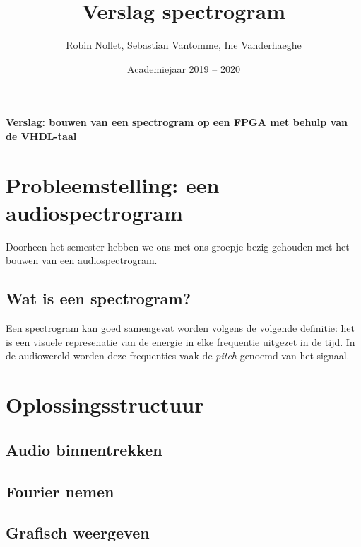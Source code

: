 \documentclass[a4paper,kul]{kulakarticle} %
\date{Academiejaar 2019 -- 2020}
\title{Verslag spectrogram}
\author{Robin Nollet, Sebastian Vantomme, Ine Vanderhaeghe}
\begin{document}
	
\maketitle
	
\begin{center}
	\centering
	\vspace*{\fill}
	\huge
	\textbf{Verslag: bouwen van een spectrogram op een FPGA met behulp van de VHDL-taal}
	\vspace*{\fill}
\end{center}
	
\newpage
	
\tableofcontents

\newpage

\section{Probleemstelling: een audiospectrogram}

Doorheen het semester hebben we ons met ons groepje bezig gehouden met het bouwen van een audiospectrogram.

\subsection{Wat is een spectrogram?}

Een spectrogram kan goed samengevat worden volgens de volgende definitie: het is een visuele represenatie van de energie in elke frequentie uitgezet in de tijd. In de audiowereld worden deze frequenties vaak de \textit{pitch} genoemd van het signaal. %

\section{Oplossingsstructuur}

\subsection{Audio binnentrekken}

\subsection{Fourier nemen}

\subsection{Grafisch weergeven}
\end{document}
